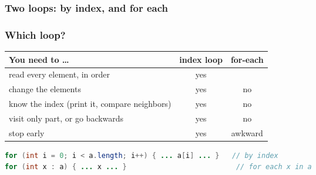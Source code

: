 \documentclass[aspectratio=169,10pt,compress]{beamer}
\begin{document}
\begin{frame}[t,fragile] \frametitle{Two loops: by index, and for each}

	\footnotesize {}
\end{frame}




\begin{frame}[t,fragile] \frametitle{Which loop?}


\begin{table}
		\small
		\begin{tabular}{@{}L{0.40\textwidth}cc@{}}
			\toprule
			\textbf{You need to \dots} & \textbf{index loop} & \textbf{for-each} \\
			\midrule
			read every element, in order                 & yes &  \\
			change the elements                          & yes & no \\
			know the index (print it, compare neighbors) & yes & no \\
			visit only part, or go backwards             & yes & no \\
			stop early                                   & yes & awkward \\
			\bottomrule
		\end{tabular}
\end{table}%


	\vspace{0.5em}


\begin{lstlisting}[style=codesnippet, language=Java]
for (int i = 0; i < a.length; i++) { ... a[i] ... }   // by index
for (int x : a) { ... x ... }                          // for each x in a
\end{lstlisting}


\end{frame}
\end{document}
